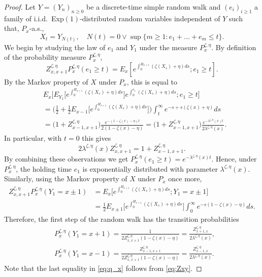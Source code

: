 \documentclass[10pt,a4paper]{amsart}
\begin{document}
\begin{proof}
  Let $Y=(Y_n)_{n \geq 0}$ be a discrete-time simple random walk and
  $(e_i)_{i \geq 1}$ a family  of
  i.i.d.~Exp$(1)$-distributed random variables independent of $Y$ such that, $P_x$-a.s.,
  \begin{equation*}
    X_t=Y_{N(t)}, \quad N(t)
    =0 \vee \sup\big\{m \geq 1: e_1 + \dots+e_m \leq t\big\}.
  \end{equation*}
  We begin by studying the law of $e_1$ and $Y_1$ under the measure $P_x^{\zeta, \eta}$.
  By definition of the probability measure $P_x^{\zeta,\eta}$,
  \begin{equation*}
    Z_{x,x+1}^{\zeta,\eta} P_x^{\zeta,\eta}(e_1 \geq t)
    = E_x\left[e^{\int_0^{H_{x+1}} (\zeta(X_s)+\eta ) ds}; e_1 \geq t \right].
  \end{equation*}
  By the Markov property of $X$ under $P_x$, this is equal to
  \begin{align*}
    & E_x\Big[E_{Y_1}\Big[e^{\int_0^{H_{x+1}} (\zeta(X_s)+\eta ) ds} \Big]
      e^{\int_0^{e_1} (\zeta(X_s)+\eta ) ds}; e_1 \geq t \Big]
    \\& =   \bigg(\frac{1}{2}+ \frac{1}{2}
      E_{x-1}\Big[e^{\int_{0}^{H_{x+1}} (\zeta(X_s)+\eta )ds }\Big]\bigg)
    \int_{t}^\infty e^{-s+s(\zeta(x)+\eta)}ds
    \\& =\big(1+Z_{x-1,x+1}^{\zeta, \eta} \big)
    \frac{e^{-(1-\zeta(x)-\eta)t}}{2(1-\zeta(x)-\eta)}
    = \big(1+Z_{x-1,x+1}^{\zeta, \eta} \big)
    \frac{e^{-\lambda^{\zeta,\eta}(x)t}}{2\lambda^{\zeta,\eta}(x)}.
  \end{align*}
  In particular, with $t=0$ this gives
  \begin{equation}\label{eq:formula_lambda}
    2\lambda^{\zeta,\eta}(x)Z_{x,x+1}^{\zeta,\eta}=1+Z_{x-1,x+1}^{\zeta,\eta}.
  \end{equation}
  By combining these observations we get
  $P_x^{\zeta,\eta}(e_1 \geq t)  = e^{-\lambda^{\zeta,\eta}(x)t}$. Hence,
  under $P_x^{\zeta, \eta}$, the holding time $e_1$ is exponentially
  distributed with parameter $\lambda^{\zeta,\eta}(x)$. Similarly, using the
  Markov property of $X $ under $P_x$ once more,
  \begin{align*}
    Z_{x,x+1}^{\zeta,\eta} P_x^{\zeta,\eta}(Y_1 = x\pm1)
    &= E_x\Big[e^{\int_0^{H_{x+1}} (\zeta(X_s)+\eta ) ds}; Y_1 = x\pm1 \Big]\\
    &= \frac{1}{2} E_{x\pm1}\Big[e^{\int_{0}^{H_{x+1}} (\zeta(X_s)+\eta )ds }\Big]
    \int_{0}^\infty e^{-s(1-\zeta(x)-\eta)}ds.
  \end{align*}
  Therefore, the first step of the random walk has the transition probabilities
  \begin{align}
    \label{eq:p_x}
    &P_x^{\zeta,\eta}(Y_1=x+1)=\frac{1}{2Z_{x,x+1}^{\zeta,\eta}(1-\zeta(x)-\eta)}=
    \frac{Z_{x+1,x}^{\zeta,\eta}}{2\lambda^{\zeta,\eta}(x)},\\ \label{eq:q_x}
    &P_x^{\zeta,\eta}(Y_1=x-1)=\frac{Z_{x-1,x+1}^{\zeta,\eta}} {2Z_{x,x+1}^{\zeta,\eta}(1-\zeta(x)-\eta)}
    =\frac{Z_{x-1,x}^{\zeta,\eta}}{2\lambda^{\zeta,\eta}(x)}.
  \end{align}
  Note that the last equality in \eqref{eq:q_x} follows from \eqref{eq:Zxy}.


\end{proof}
\end{document}
